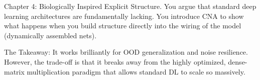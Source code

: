 Chapter 4: Biologically Inspired Explicit Structure. You argue that standard deep learning architectures are fundamentally lacking. You introduce CNA to show what happens when you build structure directly into the wiring of the model (dynamically assembled nets).

The Takeaway: It works brilliantly for OOD generalization and noise resilience. However, the trade-off is that it breaks away from the highly optimized, dense-matrix multiplication paradigm that allows standard DL to scale so massively.
